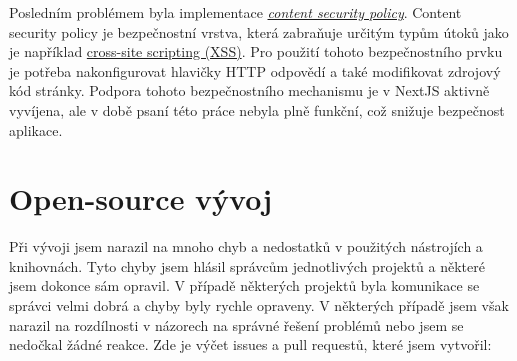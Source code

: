 Posledním problémem byla implementace \textit{\href{https://developer.mozilla.org/en-US/docs/Web/HTTP/CSP}{content security policy}}.
Content security policy je bezpečnostní vrstva, která zabraňuje určitým typům útoků jako je například \href{https://developer.mozilla.org/en-US/docs/Glossary/Cross-site_scripting}{cross-site scripting (XSS)}.
Pro použití tohoto bezpečnostního prvku je potřeba nakonfigurovat hlavičky HTTP odpovědí a také modifikovat zdrojový kód stránky.
Podpora tohoto bezpečnostního mechanismu je v NextJS aktivně vyvíjena, ale v době psaní této práce nebyla plně funkční, což snižuje bezpečnost aplikace.


\section{Open-source vývoj}\label{sec:open-source-vyvoj}

Při vývoji jsem narazil na mnoho chyb a nedostatků v použitých nástrojích a knihovnách.
Tyto chyby jsem hlásil správcům jednotlivých projektů a některé jsem dokonce sám opravil.
V případě některých projektů byla komunikace se správci velmi dobrá a chyby byly rychle opraveny.
V některých případě jsem však narazil na rozdílnosti v názorech na správné řešení problémů nebo jsem se nedočkal žádné reakce.
Zde je výčet issues a pull requestů, které jsem vytvořil:

